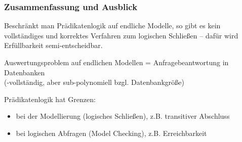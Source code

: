 \documentclass[aspectratio=1610,onlymath]{beamer}
\begin{document}
\begin{frame}\frametitle{Zusammenfassung und Ausblick}

Beschränkt man Prädikatenlogik auf endliche Modelle, so gibt es kein vollständiges und korrektes Verfahren zum logischen Schließen -- dafür wird Erfüllbarkeit semi-entscheidbar.\bigskip

Auswertungsproblem auf endlichen Modellen = Anfragebeantwortung in Datenbanken\\
(\PSpace-vollständig, aber sub-polynomiell bzgl. Datenbankgröße)\bigskip

Prädikatenlogik hat Grenzen: 
\begin{itemize}
\item bei der Modellierung (logisches Schließen), z.B. transitiver Abschluss
\item bei logischen Abfragen (Model Checking), z.B. Erreichbarkeit
\end{itemize}\bigskip


\end{frame}

% 
% 
% 
% 
% 
% 


% 
% 
\end{document}
